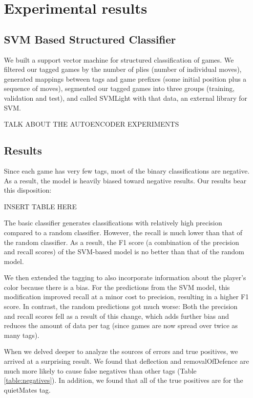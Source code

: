 \documentclass[11pt]{article}
\begin{document}
\section{Experimental results}
\subsection{SVM Based Structured Classifier}
We built a support vector machine for structured classification of games. We filtered our tagged games by the number of plies (number of individual moves), generated mappings between tags and game prefixes (some initial position plus a sequence of moves), segmented our tagged games into three groups (training, validation and test), and called SVMLight with that data, an external library for SVM.



TALK ABOUT THE AUTOENCODER EXPERIMENTS

\subsection{Results}
Since each game has very few tags, most of the binary classifications are negative. As a result, the model is heavily biased toward negative results. Our results bear this disposition:

INSERT TABLE HERE

The basic classifier generates classifications with relatively high precision compared to a random classifier. However, the recall is much lower than that of the random classifier. As a result, the F1 score (a combination of the precision and recall scores) of the SVM-based model is no better than that of the random model.

We then extended the tagging to also incorporate information about the player’s color because there is a bias. For the predictions from the SVM model, this modification improved recall at a minor cost to precision, resulting in a higher F1 score. In contrast, the random predictions got much worse: Both the precision and recall scores fell as a result of this change, which adds further bias and reduces the amount of data per tag (since games are now spread over twice as many tags).

When we delved deeper to analyze the sources of errors and true positives, we arrived at a surprising result. We found that deflection and removalOfDefence are much more likely to cause false negatives than other tags (Table \ref{table:negatives}). In addition, we found that all of the true positives are for the quietMates tag.
\end{document}
